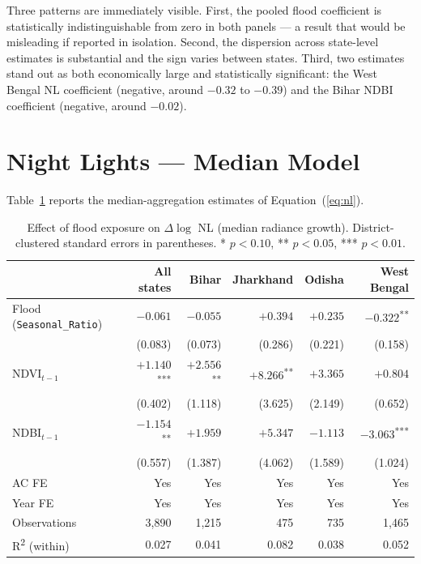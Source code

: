 \documentclass[12pt,a4paper,oneside]{report}
\begin{document}
Three patterns are immediately visible. First, the pooled flood coefficient is statistically indistinguishable from zero in both panels --- a result that would be misleading if reported in isolation. Second, the dispersion across state-level estimates is substantial and the sign varies between states. Third, two estimates stand out as both economically large and statistically significant: the West Bengal NL coefficient (negative, around $-0.32$ to $-0.39$) and the Bihar NDBI coefficient (negative, around $-0.02$).

\section{Night Lights --- Median Model}
Table~\ref{tab:nl-median} reports the median-aggregation estimates of Equation~(\ref{eq:nl}).

\begin{table}[h]
\centering
\caption{Effect of flood exposure on $\Delta \log$ NL (median radiance growth). District-clustered standard errors in parentheses. * $p<0.10$, ** $p<0.05$, *** $p<0.01$.}
\label{tab:nl-median}
\begin{tabular}{lrrrrr}
\toprule
 & \textbf{All states} & \textbf{Bihar} & \textbf{Jharkhand} & \textbf{Odisha} & \textbf{West Bengal} \\
\midrule
Flood (\texttt{Seasonal\_Ratio}) & $-0.061$       & $-0.055$ & $+0.394$ & $+0.235$ & $-0.322$\textsuperscript{**} \\
                                  & (0.083)        & (0.073) & (0.286) & (0.221) & (0.158) \\
NDVI$_{t-1}$                      & $+1.140$\textsuperscript{***} & $+2.556$\textsuperscript{**} & $+8.266$\textsuperscript{**} & $+3.365$ & $+0.804$ \\
                                  & (0.402)        & (1.118) & (3.625) & (2.149) & (0.652) \\
NDBI$_{t-1}$                      & $-1.154$\textsuperscript{**}  & $+1.959$ & $+5.347$ & $-1.113$ & $-3.063$\textsuperscript{***} \\
                                  & (0.557)        & (1.387) & (4.062) & (1.589) & (1.024) \\
\midrule
AC FE      & Yes & Yes & Yes & Yes & Yes \\
Year FE    & Yes & Yes & Yes & Yes & Yes \\
Observations & 3{,}890 & 1{,}215 & 475 & 735 & 1{,}465 \\
R\textsuperscript{2} (within) & 0.027 & 0.041 & 0.082 & 0.038 & 0.052 \\
\bottomrule
\end{tabular}
\end{table}
\end{document}
